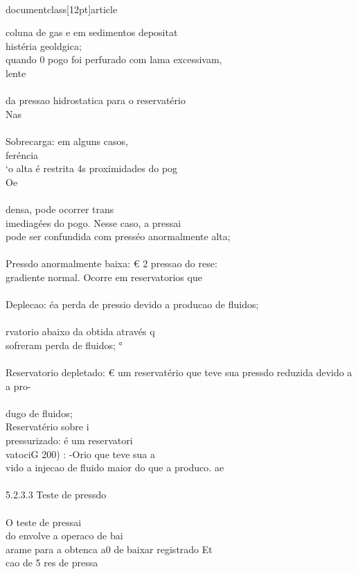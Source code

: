 \\documentclass[12pt]{article}
\begin{document}
{coluna de gas e em sedimentos depositat\\
histéria geoldgica;\\
quando 0 pogo foi perfurado com lama excessivam,\\
lente\\
\\
da pressao hidrostatica para o reservatério\\
Nas\\
\\
Sobrecarga: em alguns casos,\\
feréncia\\
‘o alta é restrita 4s proximidades do pog\\
Oe\\
\\
densa, pode ocorrer trans\\
imediagées do pogo. Nesse caso, a pressai\\
pode ser confundida com presséo anormalmente alta;\\
\\
Pressdo anormalmente baixa: € 2 pressao do rese:\\
gradiente normal. Ocorre em reservatorios que\\
\\
Deplecao: éa perda de pressio devido a producao de fluidos;\\
\\
rvatorio abaixo da obtida através q\\
sofreram perda de fluidos; °\\
\\
Reservatorio depletado: € um reservatério que teve sua pressdo reduzida devido a\\
a pro-\\
\\
dugo de fluidos;\\
Reservatério sobre i\\
pressurizado: é um reservatori\\
vatociG 200) : -Orio que teve sua a\\
vido a injecao de fluido maior do que a produco. ae\\
\\
5.2.3.3 Teste de pressdo\\
\\
O teste de pressai\\
do envolve a operaco de bai\\
arame para a obtenca a0 de baixar registrado Et\\
cao de 5 res de pressa\\
}
\end{document}
